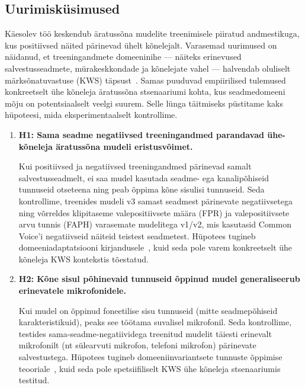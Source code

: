 
\subsection{Uurimisküsimused}
\label{sec:research-questions}

Käesolev töö keskendub äratussõna mudelite treenimisele piiratud andmestikuga, kus positiivsed näited pärinevad ühelt kõnelejalt.
Varasemad uurimused on näidanud, et treeningandmete domeeninihe --- näiteks erinevused salvestusseadmete, mürakeskkondade ja kõnelejate vahel --- halvendab oluliselt märksõnatuvastuse (KWS) täpsust~\cite{park2024adversarial, xiao2025adakws, liu2025noisekws}.
Samas puuduvad empiirilised tulemused konkreetselt ühe kõneleja äratussõna stsenaariumi kohta, kus seadmedomeeni mõju on potentsiaalselt veelgi suurem.
Selle lünga täitmiseks püstitame kaks hüpoteesi, mida eksperimentaalselt kontrollime.

\begin{enumerate}

  \item \textbf{H1: Sama seadme negatiivsed treeningandmed parandavad ühe-kõneleja äratussõna mudeli eristusvõimet.}

  Kui positiivsed ja negatiivsed treeningandmed pärinevad samalt salvestusseadmelt, ei saa mudel kasutada seadme- ega kanalipõhiseid tunnuseid otseteena ning peab õppima kõne sisulisi tunnuseid.
  Seda kontrollime, treenides mudeli v3 samast seadmest pärinevate negatiivsetega ning võrreldes klipi\-taseme valepositiivsete määra (FPR) ja valepositiivsete arvu tunnis (FAPH) varasemate mudelitega v1/v2, mis kasutasid Common Voice'i negatiivseid näiteid teistest seadmetest.
  Hüpotees tugineb domeeniadaptatsiooni kirjandusele~\cite{park2024adversarial, xiao2025adakws, liu2025noisekws}, kuid seda pole varem konkreetselt ühe kõneleja KWS kontekstis tõestatud.

  \item \textbf{H2: Kõne sisul põhinevaid tunnuseid õppinud mudel generaliseerub erinevatele mikrofonidele.}

  Kui mudel on õppinud foneetilise sisu tunnuseid (mitte seadmepõhiseid karakteristikuid), peaks see töötama suvalisel mikrofoni\-l.
  Seda kontrollime, testides sama-seadme-negatiividega treenitud mudelit täiesti erinevalt mikrofonilt (nt sülearvuti mikrofon, telefoni mikrofon) pärinevate salvestustega.
  Hüpotees tugineb domeeniinvariantsete tunnuste õppimise teooriale~\cite{liu2025noisekws, kim2024ttskws, zhang2025graphemeaug}, kuid seda pole spetsiifiliselt KWS ühe kõneleja stsenaariumis testitud.

\end{enumerate}
